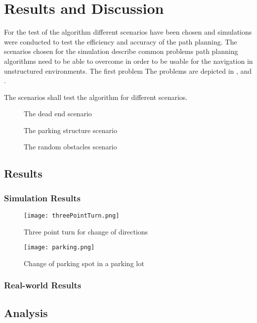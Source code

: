 \chapter{Results and Discussion}
For the test of the algorithm different scenarios have been chosen and simulations were conducted to test the efficiency and accuracy of the path planning. The scenarios chosen for the simulation describe common problems path planning algorithms need to be able to overcome in order to be usable for the navigation in unstructured environments. The first problem The problems are depicted in ,  and .

The scenarios shall test the algorithm for different scenarios.

\begin{figure}[h]
    \caption{The dead end scenario}
    \label{fig:scenarioDeadEnd}
\end{figure}

\begin{figure}[h]
    \caption{The parking structure scenario}
    \label{fig:scenarioParkingStructure}
\end{figure}

\begin{figure}[h]
    \caption{The random obstacles scenario}
    \label{fig:scenarioRandomObstacles}
\end{figure}

\section{Results}

\subsection{Simulation Results}

\begin{figure}[h]
    \texttt{[image: threePointTurn.png]}
    \caption{Three point turn for change of directions}
    \label{fig:threePointTurn}
\end{figure}

\begin{figure}[h]
    \texttt{[image: parking.png]}
    \caption{Change of parking spot in a parking lot}
    \label{fig:parking}
\end{figure}

\subsection{Real-world Results}

\section{Analysis}